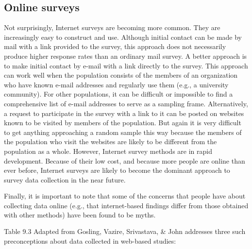 \subsection{Online surveys}


Not surprisingly, Internet surveys are becoming more common. They are increasingly easy to construct and use. Although initial contact can be made by mail with a link provided to the survey, this approach does not necessarily produce higher response rates than an ordinary mail survey. A better approach is to make initial contact by e-mail with a link directly to the survey. This approach can work well when the population consists of the members of an organization who have known e-mail addresses and regularly use them (e.g., a university community). For other populations, it can be difficult or impossible to find a comprehensive list of e-mail addresses to serve as a sampling frame. Alternatively, a request to participate in the survey with a link to it can be posted on websites known to be visited by members of the population. But again it is very difficult to get anything approaching a random sample this way because the members of the population who visit the websites are likely to be different from the population as a whole. However, Internet survey methods are in rapid development. Because of their low cost, and because more people are online than ever before, Internet surveys are likely to become the dominant approach to survey data collection in the near future.


Finally, it is important to note that some of the concerns that people have about collecting data online (e.g., that internet-based findings differ from those obtained with other methods) have been found to be myths.

Table 9.3 Adapted from Gosling, Vazire, Srivastava, \& John \citeyear{gosling_should_2004} addresses three such preconceptions about data collected in web-based studies:




